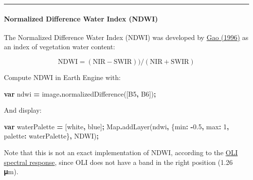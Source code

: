 \documentclass[
]{article}
\newenvironment{Shaded}{\begin{snugshade}}{\end{snugshade}}
\newcommand{\BuiltInTok}[1]{#1}
\newcommand{\DataTypeTok}[1]{\textcolor[rgb]{0.13,0.29,0.53}{#1}}
\newcommand{\DecValTok}[1]{\textcolor[rgb]{0.00,0.00,0.81}{#1}}
\newcommand{\FloatTok}[1]{\textcolor[rgb]{0.00,0.00,0.81}{#1}}
\newcommand{\FunctionTok}[1]{\textcolor[rgb]{0.00,0.00,0.00}{#1}}
\newcommand{\KeywordTok}[1]{\textcolor[rgb]{0.13,0.29,0.53}{\textbf{#1}}}
\newcommand{\NormalTok}[1]{#1}
\newcommand{\OperatorTok}[1]{\textcolor[rgb]{0.81,0.36,0.00}{\textbf{#1}}}
\newcommand{\StringTok}[1]{\textcolor[rgb]{0.31,0.60,0.02}{#1}}
\begin{document}
\begin{center}\rule{0.5\linewidth}{0.5pt}\end{center}

\hypertarget{normalized-difference-water-index-ndwi}{%
\paragraph{Normalized Difference Water Index (NDWI)}\label{normalized-difference-water-index-ndwi}}

The Normalized Difference Water Index (NDWI) was developed by \href{http://www.sciencedirect.com/science/article/pii/S0034425796000673}{Gao (1996)} as an index of vegetation water content:

\[\text{NDWI} = (\text{NIR} - \text{SWIR})) / (\text{NIR} + \text{SWIR})\]

Compute NDWI in Earth Engine with:

\begin{Shaded}
\begin{Highlighting}[]
\KeywordTok{var}\NormalTok{ ndwi }\OperatorTok{=}\NormalTok{ image}\OperatorTok{.}\FunctionTok{normalizedDifference}\NormalTok{([}\StringTok{\textquotesingle{}B5\textquotesingle{}}\OperatorTok{,} \StringTok{\textquotesingle{}B6\textquotesingle{}}\NormalTok{])}\OperatorTok{;}  
\end{Highlighting}
\end{Shaded}

And display:

\begin{Shaded}
\begin{Highlighting}[]
\KeywordTok{var}\NormalTok{ waterPalette }\OperatorTok{=}\NormalTok{ [}\StringTok{\textquotesingle{}white\textquotesingle{}}\OperatorTok{,} \StringTok{\textquotesingle{}blue\textquotesingle{}}\NormalTok{]}\OperatorTok{;}   
\BuiltInTok{Map}\OperatorTok{.}\FunctionTok{addLayer}\NormalTok{(ndwi}\OperatorTok{,} 
\NormalTok{             \{}\DataTypeTok{min}\OperatorTok{:} \OperatorTok{{-}}\FloatTok{0.5}\OperatorTok{,} \DataTypeTok{max}\OperatorTok{:} \DecValTok{1}\OperatorTok{,}  
              \DataTypeTok{palette}\OperatorTok{:}\NormalTok{ waterPalette\}}\OperatorTok{,} 
             \StringTok{\textquotesingle{}NDWI\textquotesingle{}}\NormalTok{)}\OperatorTok{;}  
\end{Highlighting}
\end{Shaded}

Note that this is not an exact implementation of NDWI, according to the \href{http://landsat.gsfc.nasa.gov/?p=5779}{OLI spectral response}, since OLI does not have a band in the right position (1.26 𝛍m).
\end{document}
